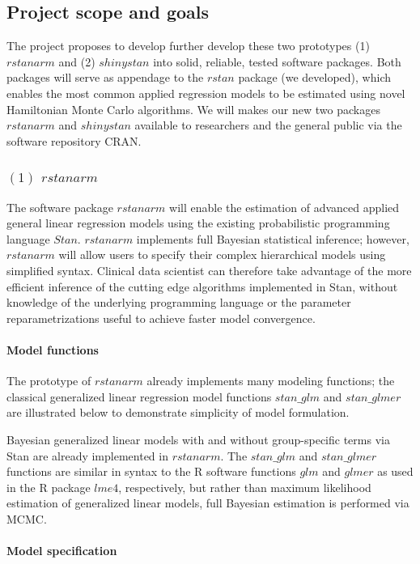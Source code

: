 \documentclass[11pt,notitlepage]{article}
\begin{document}
\subsection*{Project scope and goals }
The project proposes to develop further develop these two prototypes (1) $rstanarm$ and (2) $shinystan$ into solid, reliable, tested software packages. Both packages will serve as appendage to the $rstan$ package (we developed), which enables the most common applied regression models to be estimated using novel Hamiltonian Monte Carlo algorithms. We will makes our new two packages $rstanarm$ and $shinystan$ available to researchers and the general public via the software repository CRAN. 

\subsubsection*{$(1)$ $rstanarm$}
The software package $rstanarm$ will enable the estimation of advanced applied general linear regression models using the existing probabilistic programming language $Stan$. $rstanarm$ implements full Bayesian statistical inference;  however, $rstanarm$ will allow users to specify their complex hierarchical models using simplified syntax. Clinical data scientist can therefore take advantage of the  more efficient inference of the cutting edge algorithms implemented in Stan, without knowledge of the underlying programming language or the parameter reparametrizations useful to achieve faster model convergence.

\paragraph*{Model functions}
The prototype of $rstanarm$ already implements many modeling functions; the classical generalized linear regression model functions $stan\_glm$ and $stan\_glmer$ are illustrated below to demonstrate simplicity of model formulation.  

Bayesian generalized linear models with and without group-specific terms via Stan are already implemented in $rstanarm$. The $stan\_glm$ and $stan\_glmer$ functions are similar in syntax to the R software functions $glm$ and $glmer$ as used in the R package $lme4$, respectively, but rather than maximum likelihood estimation of generalized linear models, full Bayesian estimation is performed  via MCMC. 

\paragraph*{Model specification}
\end{document}
